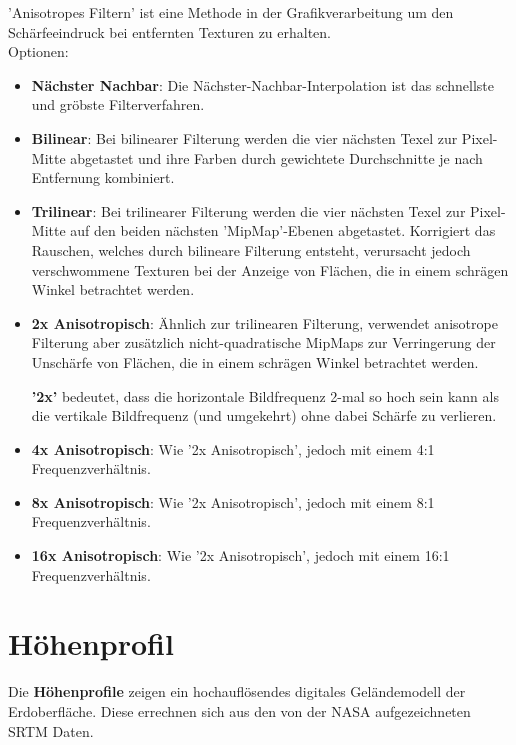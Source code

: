 \documentclass[10pt]{scrreprt}
\begin{document}
'Anisotropes Filtern'  ist eine Methode in der Grafikverarbeitung um den Schärfeeindruck bei entfernten Texturen zu erhalten.\\

Optionen:
\begin{itemize}    
\item \textbf{Nächster Nachbar}: Die Nächster-Nachbar-Interpolation ist das schnellste und gröbste Filterverfahren.
\item \textbf{Bilinear}: Bei bilinearer Filterung werden die vier nächsten Texel zur Pixel-Mitte abgetastet und ihre Farben durch gewichtete Durchschnitte je nach Entfernung kombiniert.
\item \textbf{Trilinear}: Bei trilinearer Filterung werden die vier nächsten Texel zur Pixel-Mitte auf den beiden nächsten 'MipMap'-Ebenen abgetastet. Korrigiert das Rauschen, welches durch bilineare Filterung entsteht, verursacht jedoch verschwommene Texturen bei der Anzeige von Flächen, die in einem schrägen Winkel betrachtet werden.
\item \textbf{2x Anisotropisch}: Ähnlich zur trilinearen Filterung, verwendet anisotrope Filterung aber zusätzlich nicht-quadratische MipMaps zur Verringerung der Unschärfe von Flächen, die in einem schrägen Winkel betrachtet werden.

\textbf{'2x'} bedeutet, dass die horizontale Bildfrequenz 2-mal so hoch sein kann als die vertikale Bildfrequenz (und umgekehrt) ohne dabei Schärfe zu verlieren.
\item \textbf{4x Anisotropisch}: Wie '2x Anisotropisch', jedoch mit einem 4:1 Frequenzverhältnis.
\item \textbf{8x Anisotropisch}: Wie '2x Anisotropisch', jedoch mit einem 8:1 Frequenzverhältnis.
\item \textbf{16x Anisotropisch}: Wie '2x Anisotropisch', jedoch mit einem 16:1 Frequenzverhältnis.
\end{itemize}


\newpage
\section{Höhenprofil} 
Die \textbf{Höhenprofile} zeigen ein hochauflösendes digitales Geländemodell der Erdoberfläche. Diese errechnen sich aus den von der NASA  aufgezeichneten SRTM  Daten.\\
\end{document}
